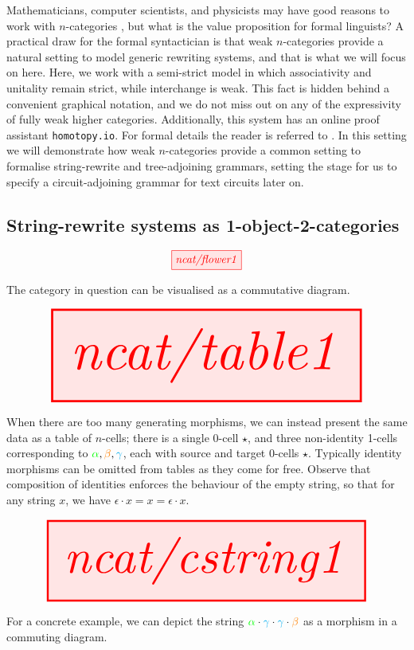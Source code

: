 Mathematicians, computer scientists, and physicists may have good reasons to work with $n$-categories \citep{baez_introduction_1997}, but what is the value proposition for formal linguists? A practical draw for the formal syntactician is that weak $n$-categories provide a natural setting to model generic rewriting systems, and that is what we will focus on here. Here, we work with a semi-strict model in which associativity and unitality remain strict, while interchange is weak. This fact is hidden behind a convenient graphical notation, and we do not miss out on any of the expressivity of fully weak higher categories. Additionally, this system has an online proof assistant \texttt{homotopy.io}. For formal details the reader is referred to \citep{nlab_authors_homotopyio_nodate,dorn_associative_2023,reutter_high-level_2019,heidemann_zigzag_2022}. In this setting we will demonstrate how weak $n$-categories provide a common setting to formalise string-rewrite and tree-adjoining grammars, setting the stage for us to specify a circuit-adjoining grammar for text circuits later on.

\newpage

\subsection{String-rewrite systems as 1-object-2-categories}

\begin{marginfigure}
\centering
\[\tikzfig{ncat/flower1}\]
\caption{The category in question can be visualised as a commutative diagram.}
\end{marginfigure}

\begin{marginfigure}
\centering
\[\resizebox{\textwidth}{!}{\tikzfig{ncat/table1}}\]
\caption{When there are too many generating morphisms, we can instead present the same data as a table of $n$-cells; there is a single 0-cell $\star$, and three non-identity 1-cells corresponding to $\textcolor{green}{\alpha}, \textcolor{orange}{\beta}, \textcolor{cyan}{\gamma}$, each with source and target 0-cells $\star$. Typically identity morphisms can be omitted from tables as they come for free. Observe that composition of identities enforces the behaviour of the empty string, so that for any string $x$, we have $\epsilon \cdot x = x = \epsilon \cdot x$.}
\end{marginfigure}

\begin{marginfigure}
\centering
\[\resizebox{\textwidth}{!}{\tikzfig{ncat/cstring1}}\]
\caption{For a concrete example, we can depict the string $\textcolor{green}{\alpha} \cdot \textcolor{cyan}{\gamma} \cdot \textcolor{cyan}{\gamma} \cdot \textcolor{orange}{\beta}$ as a morphism in a commuting diagram.}
\end{marginfigure}

